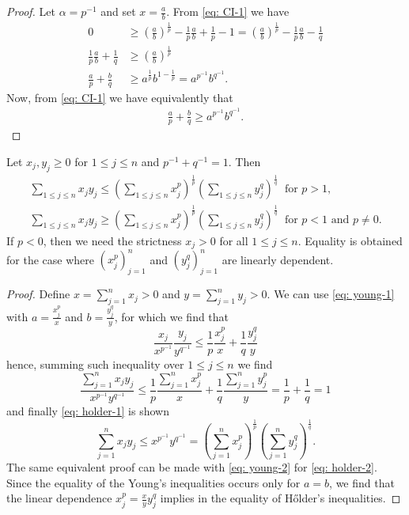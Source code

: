 \begin{proof}
Let \(\alpha = p^{-1}\) and set \(x = \frac a b\). From \cref{eq: CI-1} we
have
\begin{align*}
0 &\geq \left(\frac a b\right)^{\frac 1 p} - \frac 1 p \frac a b + \frac 1 p
- 1 = \left(\frac a b \right)^{\frac 1 p} - \frac 1 p \frac a b - \frac 1 q
\\
\frac 1 p \frac a b + \frac 1 q
    &\geq \left( \frac a b \right)^{\frac 1 p}
\\
\frac a p + \frac b q
    &\geq a^{\frac 1 p} b^{1 - \frac 1 p} = a^{p^{-1}} b^{q^{-1}}.
\end{align*}
Now, from \cref{eq: CI-1} we have equivalently that
\begin{align*}
\frac a p + \frac b q \geq a^{p^{-1}} b^{q^{-1}}.
\end{align*}
\end{proof}

\begin{proposition}\label{prop: holder-ineq}
Let \(x_j, y_j \geq 0\) for \(1 \leq j \leq n\) and \(p^{-1} + q^{-1} = 1\).
Then
\begin{gather}
\label{eq: holder-1}
\sum_{1 \leq j \leq n} x_j y_j \leq \left( \sum_{1 \leq j \leq n} x_j^p
\right)^{\frac 1 p} \left( \sum_{1 \leq j \leq n} y_j^q \right)^{\frac 1 q}\
\text{ for } p > 1, \\
\label{eq: holder-2}
\sum_{1 \leq j \leq n} x_j y_j \geq \left( \sum_{1 \leq j \leq n} x_j^p
\right)^{\frac 1 p} \left( \sum_{1 \leq j \leq n} y_j^q \right)^{\frac 1 q}\
\text{ for } p < 1 \text{ and } p \neq 0.
\end{gather}
If \(p < 0\), then we need the strictness \(x_j > 0\) for all \(1 \leq j \leq
n\). Equality is obtained for the case where \((x_j^p)_{j=1}^n\) and
\((y_j^q)_{j=1}^n\) are linearly dependent.
\end{proposition}

\begin{proof}
Define \(x = \sum_{j=1}^n x_j > 0\) and \(y = \sum_{j=1}^n y_j > 0\). We can
use \cref{eq: young-1} with \(a = \frac {x_j^p} x\) and \(b = \frac {y_j^q}
y\), for which we find that
\[
\frac{x_j}{x^{p^{-1}}} \frac{y_j}{y^{q^{-1}}} \leq \frac 1 p \frac{x_j^p} x
+ \frac 1 q \frac{y_j^q} y
\]
hence, summing such inequality over \(1 \leq j \leq n\) we find
\[
\frac{\sum_{j=1}^n x_j y_j}{x^{p^{-1}} y^{q^{-1}}} \leq \frac 1 p
\frac{\sum_{j=1}^n x_j^p} x + \frac 1 q \frac{\sum_{j=1}^n y_j^p} y = \frac
1 p + \frac 1 q = 1
\]
and finally \cref{eq: holder-1} is shown
\[
\sum_{j=1}^n x_j y_j \leq x^{p^{-1}} y^{q^{-1}}
= \left(\sum_{j=1}^n x_j^p\right)^{\frac 1 p}
\left(\sum_{j=1}^n y_j^q\right)^{\frac 1 q}.
\]
The same equivalent proof can be made with \cref{eq: young-2} for \cref{eq:
holder-2}. Since the equality of the Young's inequalities occurs only for \(a
= b\), we find that the linear dependence \(x_j^p = \frac x y y_j^q\) implies
in the equality of H\H{o}lder's inequalities.
\end{proof}

